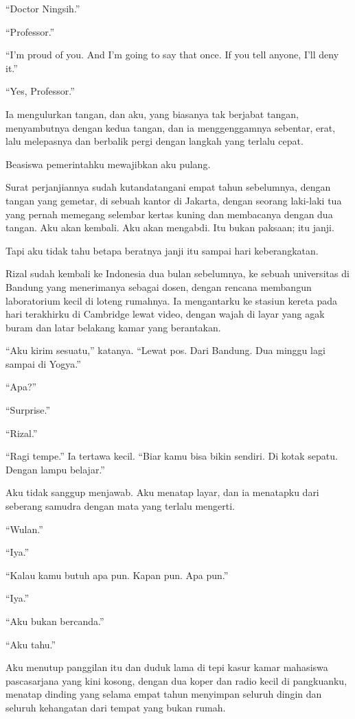\documentclass[11pt,twoside,openany]{book}
\makeatletter
\newcommand{\scenebreak}{\par\vspace{0.9em}{\centering\textsc{*\hspace{0.7em}*\hspace{0.7em}*}\par}\vspace{0.9em}\@afterindentfalse\@afterheading}
\makeatother
\begin{document}
``Doctor Ningsih.''

``Professor.''

``I'm proud of you. And I'm going to say that once. If you tell anyone, I'll deny it.''

``Yes, Professor.''

Ia mengulurkan tangan, dan aku, yang biasanya tak berjabat tangan, menyambutnya dengan kedua tangan, dan ia menggenggamnya sebentar, erat, lalu melepasnya dan berbalik pergi dengan langkah yang terlalu cepat.

\scenebreak
Beasiswa pemerintahku mewajibkan aku pulang.

Surat perjanjiannya sudah kutandatangani empat tahun sebelumnya, dengan tangan yang gemetar, di sebuah kantor di Jakarta, dengan seorang laki-laki tua yang pernah memegang selembar kertas kuning dan membacanya dengan dua tangan. Aku akan kembali. Aku akan mengabdi. Itu bukan paksaan; itu janji.

Tapi aku tidak tahu betapa beratnya janji itu sampai hari keberangkatan.

Rizal sudah kembali ke Indonesia dua bulan sebelumnya, ke sebuah universitas di Bandung yang menerimanya sebagai dosen, dengan rencana membangun laboratorium kecil di loteng rumahnya. Ia mengantarku ke stasiun kereta pada hari terakhirku di Cambridge lewat video, dengan wajah di layar yang agak buram dan latar belakang kamar yang berantakan.

``Aku kirim sesuatu,'' katanya. ``Lewat pos. Dari Bandung. Dua minggu lagi sampai di Yogya.''

``Apa?''

``Surprise.''

``Rizal.''

``Ragi tempe.'' Ia tertawa kecil. ``Biar kamu bisa bikin sendiri. Di kotak sepatu. Dengan lampu belajar.''

Aku tidak sanggup menjawab. Aku menatap layar, dan ia menatapku dari seberang samudra dengan mata yang terlalu mengerti.

``Wulan.''

``Iya.''

``Kalau kamu butuh apa pun. Kapan pun. Apa pun.''

``Iya.''

``Aku bukan bercanda.''

``Aku tahu.''

Aku menutup panggilan itu dan duduk lama di tepi kasur kamar mahasiswa pascasarjana yang kini kosong, dengan dua koper dan radio kecil di pangkuanku, menatap dinding yang selama empat tahun menyimpan seluruh dingin dan seluruh kehangatan dari tempat yang bukan rumah.
\end{document}

